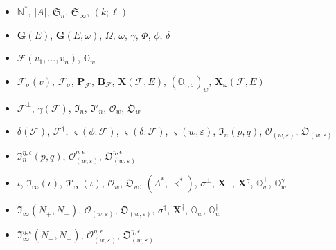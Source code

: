 \documentclass{amsart}
\theoremstyle{definition}
\newcommand{\bs}[1]{\boldsymbol{#1}}
\begin{document}
\begin{itemize}
\item[\S\ref{S.intro}:] $\mathbb{N}^*$, $|A|$, $\mathfrak{S}_n$, $\mathfrak{S}_\infty$, $(k;\ell)$

\smallskip
\item[\S\ref{S2.1}:] $\mathbf{G}(E)$, $\mathbf{G}(E,\omega)$, $\Omega$, $\omega$, $\gamma$, $\Phi$, $\phi$, $\delta$

\smallskip
\item[\S\ref{S2.2}:] $\mathcal{F}(v_1,\ldots,v_n)$, $\mathbb{O}_w$

\smallskip
\item[\S\ref{S2.3}:] $\mathcal{F}_\sigma(\underline{v})$, $\mathcal{F}_\sigma$,
$\mathbf{P}_\mathcal{F}$, $\mathbf{B}_\mathcal{F}$, $\mathbf{X}(\mathcal{F},E)$, $(\pmb{\mathbb{O}}_{\tau,\sigma})_w$, $\mathbf{X}_\omega(\mathcal{F},E)$

\smallskip
\item[\S\ref{S3.1}:] $\mathcal{F}^\perp$, $\gamma(\mathcal{F})$, $\mathfrak{I}_n$, $\mathfrak{I}'_n$, $\mathcal{O}_w$, $\mathfrak{O}_w$

\smallskip
\item[\S\ref{S3.2}:] $\delta(\mathcal{F})$, $\mathcal{F}^\dag$, $\varsigma(\phi:\mathcal{F})$, $\varsigma(\delta:\mathcal{F})$, $\varsigma(w,\varepsilon)$, $\mathfrak{I}_n(p,q)$, $\mathcal{O}_{(w,\varepsilon)}$, $\mathfrak{O}_{(w,\varepsilon)}$

\smallskip
\item[\S\ref{S3.3}:] $\mathfrak{I}^{\eta,\epsilon}_n(p,q)$, $\mathcal{O}^{\eta,\epsilon}_{(w,\varepsilon)}$, $\mathfrak{O}^{\eta,\epsilon}_{(w,\varepsilon)}$
\smallskip
\item[\S\ref{S4.1}:] $\iota$, $\mathfrak{I}_\infty(\iota)$, $\mathfrak{I}'_\infty(\iota)$, $\bs{\mathcal{O}}_w$, $\bs{\mathfrak{O}}_w$, $(A^*,\prec^*)$, $\sigma^\perp$, $\mathbf{X}^\perp$, $\mathbf{X}^\gamma$, $\pmb{\mathbb{O}}_w^\perp$, $\pmb{\mathbb{O}}_w^\gamma$
\smallskip
\item[\S\ref{S4.2}:] $\mathfrak{I}_\infty(N_+,N_-)$, $\bs{\mathcal{O}}_{(w,\varepsilon)}$, $\bs{\mathfrak{O}}_{(w,\varepsilon)}$, $\sigma^\dag$, $\mathbf{X}^\dag$, $\pmb{\mathbb{O}}_w$, $\pmb{\mathbb{O}}_w^\dag$
\smallskip
\item[\S\ref{S4.3}:] $\mathfrak{I}_\infty^{\eta,\epsilon}(N_+,N_-)$, $\bs{\mathcal{O}}_{(w,\varepsilon)}^{\eta,\epsilon}$, $\bs{\mathfrak{O}}_{(w,\varepsilon)}^{\eta,\epsilon}$
\end{itemize}
\end{document}
